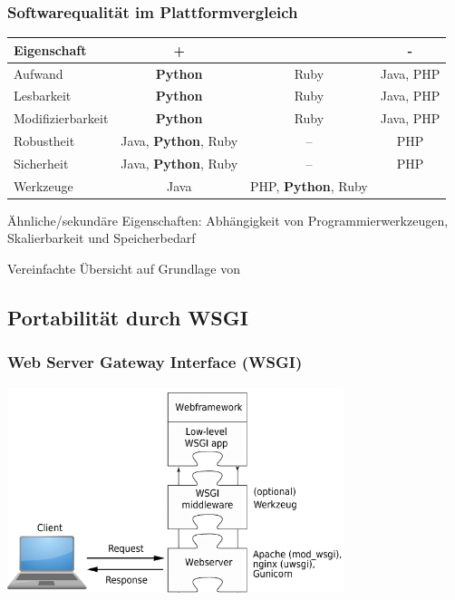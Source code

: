 \documentclass[
    t,
    smaller,
    compress,
    xcolor=svgnames,            %
    table,
]{beamer}
\begin{document}
\begin{frame}[fragile]
  \frametitle{Softwarequalität im Plattformvergleich}

  \begin{table}[h]
    \begin{tabular}{|l||c|c|c|}
     \hline
      Eigenschaft          & \cellcolor{dkgreen} + & \cellcolor{yellow} & \cellcolor{red} - \\ \hline \hline

      Aufwand   & \textbf{Python} & Ruby & Java, PHP  \\ \hline
      Lesbarkeit           & \textbf{Python} & Ruby & Java, PHP \\ \hline
      Modifizierbarkeit    & \textbf{Python} & Ruby & Java, PHP \\ \hline
      Robustheit           & Java, \textbf{Python}, Ruby & -- & PHP \\ \hline
      Sicherheit           & Java, \textbf{Python}, Ruby & -- & PHP \\ \hline
      Werkzeuge & Java & PHP, \textbf{Python}, Ruby &  \\ \hline
    \end{tabular}
  \end{table}

  Ähnliche/sekundäre Eigenschaften: Abhängigkeit von Programmierwerkzeugen,
  Skalierbarkeit und Speicherbedarf

  \vspace{12pt}
  Vereinfachte Übersicht auf Grundlage von %
\end{frame}


\subsection{Portabilität durch WSGI}
\begin{frame}
  \frametitle{Web Server Gateway Interface (WSGI)}
  \includegraphics[height=60mm]{wsgi.png}
\end{frame}
\end{document}
